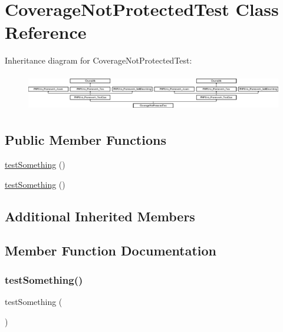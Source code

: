 \hypertarget{class_coverage_not_protected_test}{}\section{Coverage\+Not\+Protected\+Test Class Reference}
\label{class_coverage_not_protected_test}
Inheritance diagram for Coverage\+Not\+Protected\+Test\+:\begin{figure}[H]
\begin{center}
\leavevmode
\includegraphics[height=1.651917cm]{class_coverage_not_protected_test}
\end{center}
\end{figure}
\subsection*{Public Member Functions}
\begin{DoxyCompactItemize}
\item 
\mbox{\hyperlink{class_coverage_not_protected_test_a0fc4e17369bc9607ebdd850d9eda8167}{test\+Something}} ()
\item 
\mbox{\hyperlink{class_coverage_not_protected_test_a0fc4e17369bc9607ebdd850d9eda8167}{test\+Something}} ()
\end{DoxyCompactItemize}
\subsection*{Additional Inherited Members}


\subsection{Member Function Documentation}
\mbox{\label{class_coverage_not_protected_test_a0fc4e17369bc9607ebdd850d9eda8167}} 
\subsubsection{\texorpdfstring{test\+Something()}{testSomething()}\hspace{0.1cm}{\footnotesize\ttfamily [1/2]}}
{\footnotesize\ttfamily test\+Something (\begin{DoxyParamCaption}{ }\end{DoxyParamCaption})}

